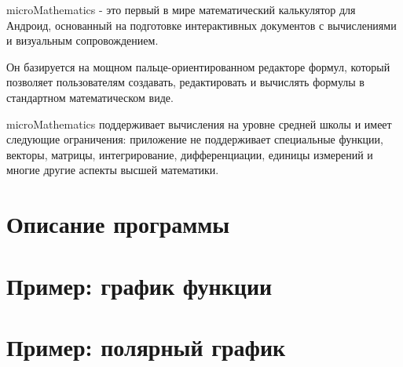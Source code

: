 \documentclass[DIV=calc, paper=a4, fontsize=11pt, twocolumn]{scrartcl}
\begin{document}
\maketitle
\thispagestyle{fancy} %

\begin{bf}
microMathematics - это первый в мире математический
калькулятор для Андроид, основанный на подготовке интерактивных документов с
вычислениями и визуальным сопровождением.

Он базируется на мощном пальце-ориентированном редакторе формул, который
позволяет пользователям создавать, редактировать и вычислять формулы в
стандартном математическом виде.

microMathematics поддерживает вычисления на уровне средней школы и имеет
следующие ограничения: приложение не поддерживает специальные функции,
векторы, матрицы, интегрирование, дифференциации, единицы измерений и
многие другие аспекты высшей математики.
\end{bf}

\section{Описание программы}


\section{Пример: график функции}


\section{Пример: полярный график}

\end{document}
